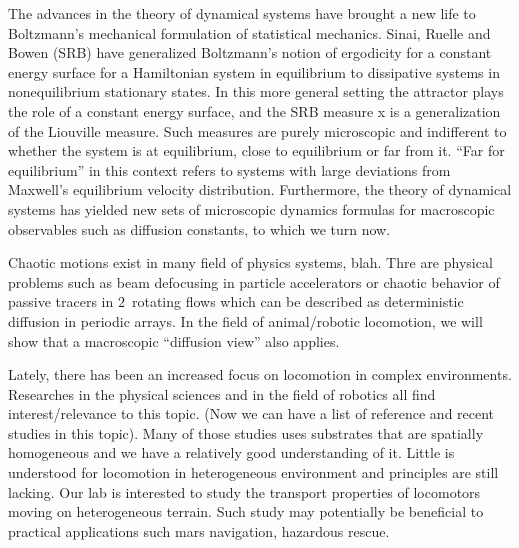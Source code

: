 


The advances in the theory of dynamical systems have brought a new life
to Boltzmann's mechanical formulation of statistical mechanics. Sinai,
Ruelle and Bowen (SRB) have generalized Boltzmann's notion of ergodicity
for a constant energy surface for a Hamiltonian system in equilibrium to
dissipative systems in {nonequilibrium} stationary states. In this more
general setting the attractor plays the role of a constant energy
surface, and the SRB measure x is a generalization of the Liouville
measure. Such measures are purely microscopic and indifferent to whether
the system is at equilibrium, close to equilibrium or far from it.  ``Far
for equilibrium'' in this context refers to systems with large deviations
from Maxwell's equilibrium velocity distribution. Furthermore, the theory
of dynamical systems has yielded new sets of microscopic dynamics
formulas for macroscopic observables such as diffusion constants, to
which we turn now.
%
%

Chaotic motions exist in many field of physics systems, blah. Thre are
physical problems such as beam defocusing in particle accelerators or
chaotic behavior of passive tracers in $2$\dmn\ rotating flows which can
be described as deterministic diffusion in periodic arrays. In the field
of animal/robotic locomotion, we will show that a macroscopic ``diffusion
view'' also applies.

Lately, there has been an increased focus on locomotion in complex
environments. Researches in the physical sciences and in the field of
robotics all find interest/relevance to this topic. (Now we can have a
list of reference and recent studies in this topic). Many of those
studies uses substrates that are spatially homogeneous and we have a
relatively good understanding of it. Little is understood for locomotion
in heterogeneous environment and principles are still lacking. Our lab is
interested to study the transport properties of locomotors moving on
heterogeneous terrain. Such study may potentially be beneficial to
practical applications such mars navigation, hazardous rescue.


